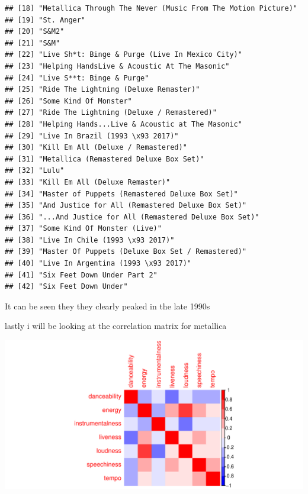 \documentclass[12pt,preprint, authoryear]{elsarticle}
\let\origfigure\figure
\let\endorigfigure\endfigure
\renewenvironment{figure}[1][2] {
    \expandafter\origfigure\expandafter[H]
} {
    \endorigfigure
}
\numberwithin{equation}{section}
\numberwithin{figure}{section}
\numberwithin{table}{section}
\begin{document}
\begin{verbatim}
## [18] "Metallica Through The Never (Music From The Motion Picture)"
## [19] "St. Anger"                                                  
## [20] "S&M2"                                                       
## [21] "S&M"                                                        
## [22] "Live Sh*t: Binge & Purge (Live In Mexico City)"             
## [23] "Helping HandsLive & Acoustic At The Masonic"                
## [24] "Live S**t: Binge & Purge"                                   
## [25] "Ride The Lightning (Deluxe Remaster)"                       
## [26] "Some Kind Of Monster"                                       
## [27] "Ride The Lightning (Deluxe / Remastered)"                   
## [28] "Helping Hands...Live & Acoustic at The Masonic"             
## [29] "Live In Brazil (1993 \x93 2017)"                            
## [30] "Kill Em All (Deluxe / Remastered)"                          
## [31] "Metallica (Remastered Deluxe Box Set)"                      
## [32] "Lulu"                                                       
## [33] "Kill Em All (Deluxe Remaster)"                              
## [34] "Master of Puppets (Remastered Deluxe Box Set)"              
## [35] "And Justice for All (Remastered Deluxe Box Set)"            
## [36] "...And Justice for All (Remastered Deluxe Box Set)"         
## [37] "Some Kind Of Monster (Live)"                                
## [38] "Live In Chile (1993 \x93 2017)"                             
## [39] "Master Of Puppets (Deluxe Box Set / Remastered)"            
## [40] "Live In Argentina (1993 \x93 2017)"                         
## [41] "Six Feet Down Under Part 2"                                 
## [42] "Six Feet Down Under"
\end{verbatim}

It can be seen they they clearly peaked in the late 1990s

lastly i will be looking at the correlation matrix for metallica

\begin{figure}[H]

{\centering \includegraphics{Q3_files/figure-latex/Figure6-1} 

}

\caption{Correlation matrix  \label{Figure6}}\label{fig:Figure6}
\end{figure}
\end{document}
